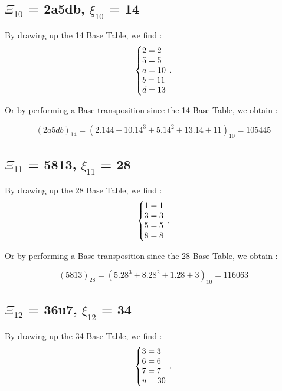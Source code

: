 \documentclass{article}
\begin{document}
\subsection{$\Xi_{10}$ = 2a5db, $\xi_{10}$ = 14}
By drawing up the 14 Base Table, we find :
\begin{equation}
\centering
\left\{\begin{array}{@{}l@{}}
2=2 \\
5=5 \\
a=10 \\
b=11 \\
d=13 \\
\end{array}\right.\,.
\end{equation}

\begin{flushleft}
	Or by performing a Base transposition since the 14 Base Table, we obtain :
\end{flushleft}
\begin{equation}
(2a5db)_{14}=(2.14{4}+10.14^{3}+5.14^{2}+13.14+11)_{10}=105 445
\end{equation}

\subsection{$\Xi_{11}$ = 5813, $\xi_{11}$ = 28}
By drawing up the 28 Base Table, we find :
\begin{equation}
\centering
\left\{\begin{array}{@{}l@{}}
1=1 \\
3=3 \\
5=5 \\
8=8 \\

\end{array}\right.\,.
\end{equation}

\begin{flushleft}
	Or by performing a Base transposition since the 28 Base Table, we obtain :
\end{flushleft}
\begin{equation}
(5813)_{28}=(5.28^{3}+8.28^{2}+1.28+3)_{10}=116 063
\end{equation}

\subsection{$\Xi_{12}$ = 36u7, $\xi_{12}$ = 34}
By drawing up the 34 Base Table, we find :
\begin{equation}
\centering
\left\{\begin{array}{@{}l@{}}
3=3 \\
6=6 \\
7=7 \\
u=30 \\
\end{array}\right.\,.
\end{equation}
\end{document}
